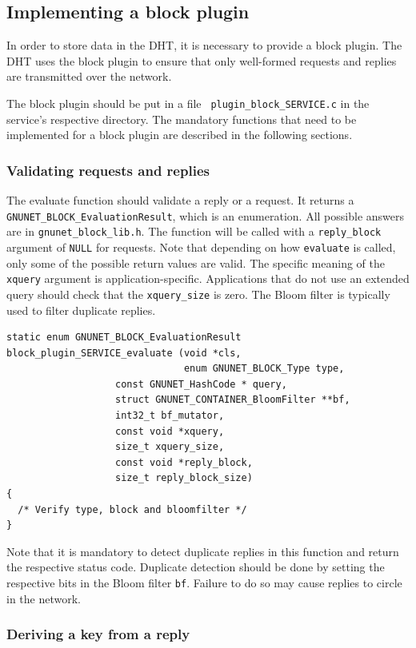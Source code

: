 \documentclass[10pt]{article}
\begin{document}
\subsection{Implementing a block plugin}

In order to store data in the DHT, it is necessary to provide a block
plugin.  The DHT uses the block plugin to ensure that only well-formed
requests and replies are transmitted over the network.

The block plugin should be put in a file {\tt
  plugin\_block\_SERVICE.c} in the service's respective directory. The
mandatory functions that need to be implemented for a block plugin are
described in the following sections.

\subsubsection{Validating requests and replies}

The evaluate function should validate a reply or a request. It returns
a {\tt GNUNET\_BLOCK\_EvaluationResult}, which is an enumeration. All
possible answers are in {\tt gnunet\_block\_lib.h}.  The function will
be called with a {\tt reply\_block} argument of {\tt NULL} for
requests.  Note that depending on how {\tt evaluate} is called, only
some of the possible return values are valid.  The specific meaning of
the {\tt xquery} argument is application-specific.  Applications that
do not use an extended query should check that the {\tt xquery\_size}
is zero.  The Bloom filter is typically used to filter duplicate
replies.

\lstset{language=C}
\begin{lstlisting}
static enum GNUNET_BLOCK_EvaluationResult
block_plugin_SERVICE_evaluate (void *cls,
                               enum GNUNET_BLOCK_Type type,
			       const GNUNET_HashCode * query,
			       struct GNUNET_CONTAINER_BloomFilter **bf,
			       int32_t bf_mutator,
			       const void *xquery,
			       size_t xquery_size,
			       const void *reply_block,
			       size_t reply_block_size)
{
  /* Verify type, block and bloomfilter */
}
\end{lstlisting}

Note that it is mandatory to detect duplicate replies in this
function and return the respective status code.  Duplicate
detection should be done by setting the respective bits in
the Bloom filter {\tt bf}.  Failure to do so may cause replies
to circle in the network.

\subsubsection{Deriving a key from a reply}
\end{document}
